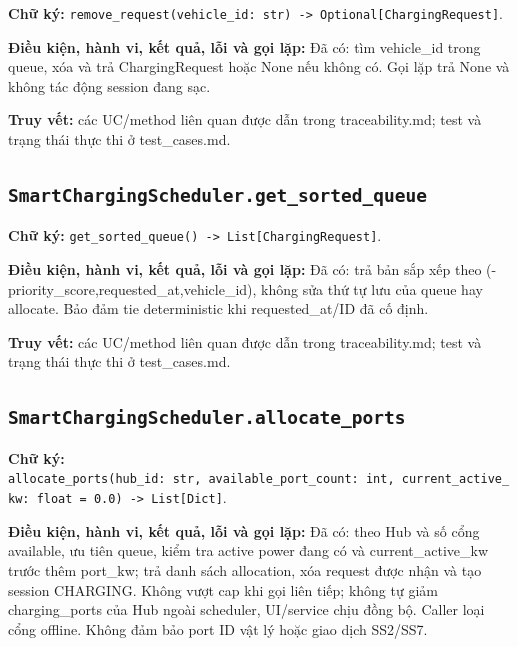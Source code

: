 \documentclass[11pt,a4paper]{article}
\begin{document}
\textbf{Chữ ký:}
\texttt{remove\_request(vehicle\_id:\ str)\ -\textgreater{}\ Optional{[}ChargingRequest{]}}.

\textbf{Điều kiện, hành vi, kết quả, lỗi và gọi lặp:} Đã có: tìm
vehicle\_id trong queue, xóa và trả ChargingRequest hoặc None nếu không
có. Gọi lặp trả None và không tác động session đang sạc.

\textbf{Truy vết:} các UC/method liên quan được dẫn trong
traceability.md; test và trạng thái thực thi ở test\_cases.md.

\hypertarget{smartchargingscheduler.get_sorted_queue}{%
\subsection{\texorpdfstring{\texttt{SmartChargingScheduler.get\_sorted\_queue}}{SmartChargingScheduler.get\_sorted\_queue}}\label{smartchargingscheduler.get_sorted_queue}}

\textbf{Chữ ký:}
\texttt{get\_sorted\_queue()\ -\textgreater{}\ List{[}ChargingRequest{]}}.

\textbf{Điều kiện, hành vi, kết quả, lỗi và gọi lặp:} Đã có: trả bản sắp
xếp theo (-priority\_score,requested\_at,vehicle\_id), không sửa thứ tự
lưu của queue hay allocate. Bảo đảm tie deterministic khi
requested\_at/ID đã cố định.

\textbf{Truy vết:} các UC/method liên quan được dẫn trong
traceability.md; test và trạng thái thực thi ở test\_cases.md.

\hypertarget{smartchargingscheduler.allocate_ports}{%
\subsection{\texorpdfstring{\texttt{SmartChargingScheduler.allocate\_ports}}{SmartChargingScheduler.allocate\_ports}}\label{smartchargingscheduler.allocate_ports}}

\textbf{Chữ ký:}
\texttt{allocate\_ports(hub\_id:\ str,\ available\_port\_count:\ int,\ current\_active\_kw:\ float\ =\ 0.0)\ -\textgreater{}\ List{[}Dict{]}}.

\textbf{Điều kiện, hành vi, kết quả, lỗi và gọi lặp:} Đã có: theo Hub và
số cổng available, ưu tiên queue, kiểm tra active power đang có và
current\_active\_kw trước thêm port\_kw; trả danh sách allocation, xóa
request được nhận và tạo session CHARGING. Không vượt cap khi gọi liên
tiếp; không tự giảm charging\_ports của Hub ngoài scheduler, UI/service
chịu đồng bộ. Caller loại cổng offline. Không đảm bảo port ID vật lý
hoặc giao dịch SS2/SS7.
\end{document}
